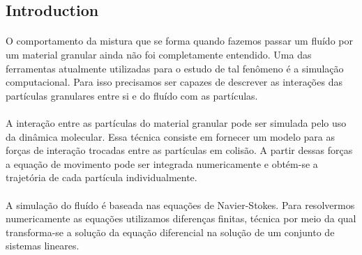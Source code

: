 \documentclass[a0,portrait]{a0poster}
\begin{document}

\begin{multicols}{2} %






\color{SaddleBrown} %

\section*{Introduction}
\paragraph{} O comportamento da mistura que se forma quando fazemos passar
um fluído por um material granular ainda não foi completamente 
entendido. Uma das ferramentas atualmente utilizadas para o estudo de tal
fenômeno é a simulação computacional. Para isso precisamos ser capazes
de descrever as interações das partículas granulares entre si e do fluído
com as partículas.
\paragraph{}A interação entre as partículas do material granular pode
ser simulada pelo uso da dinâmica molecular. Essa técnica consiste em 
fornecer um modelo para as forças de interação trocadas entre as partículas
em colisão. A partir dessas forças a equação de movimento pode ser integrada 
numericamente e obtém-se a trajetória de cada partícula individualmente.
\paragraph{}A simulação do fluído é baseada nas equações
de Navier-Stokes. Para resolvermos numericamente as equações utilizamos
diferenças finitas, técnica por meio da qual transforma-se a solução da
equação diferencial na solução de um conjunto de sistemas lineares.


\end{multicols}
\end{document}
